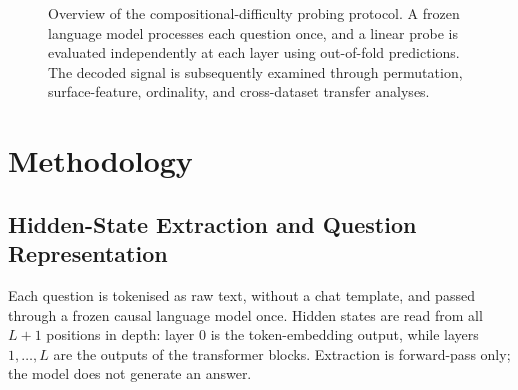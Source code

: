 \begin{figure}[htbp]
  \caption[Overview of the compositional-difficulty probing protocol]{Overview
    of the compositional-difficulty probing protocol. A frozen language model
    processes each question once, and a linear probe is evaluated independently
    at each layer using out-of-fold predictions. The decoded signal is
    subsequently examined through permutation, surface-feature, ordinality, and
    cross-dataset transfer analyses.}
  \label{fig:probing-method-overview}
\end{figure}

\section{Methodology}
\label{sec:probing-methodology}

\subsection{Hidden-State Extraction and Question Representation}
\label{subsec:hidden-state-extraction}

Each question is tokenised as raw text, without a chat template, and passed
through a frozen causal language model once. Hidden states are read from all
\(L+1\) positions in depth: layer \(0\) is the token-embedding output, while
layers \(1,\ldots,L\) are the outputs of the transformer blocks. Extraction is
forward-pass only; the model does not generate an answer.

